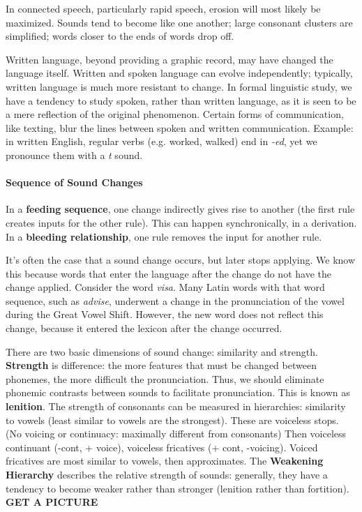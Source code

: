 \documentclass{exam}
\begin{document}
In connected speech, particularly rapid speech, erosion will most likely be maximized. Sounds tend to become like one another; large consonant clusters are simplified; words closer to the ends of words drop off. 

Written language, beyond providing a graphic record, may have changed the language itself. Written and spoken language can evolve independently; typically, written language is much more resistant to change. In formal linguistic study, we have a tendency to study spoken, rather than written language, as it is seen to be a mere reflection of the original phenomenon. Certain forms of communication, like texting, blur the lines between spoken and written communication. Example: in written English, regular verbs (e.g. worked, walked) end in \textit{-ed}, yet we pronounce them with a \textit{t} sound. 

\paragraph{Sequence of Sound Changes} In a \textbf{feeding sequence}, one change indirectly gives rise to another (the first rule creates inputs for the other rule). This can happen synchronically, in a derivation. In a \textbf{bleeding relationship}, one rule removes the input for another rule.

It's often the case that a sound change occurs, but later stops applying. We know this because words that enter the language after the change do not have the change applied. Consider the word \textit{visa}. Many Latin words with that word sequence, such as \textit{advise}, underwent a change in the pronunciation of the vowel during the Great Vowel Shift. However, the new word does not reflect this change, because it entered the lexicon after the change occurred. 

There are two basic dimensions of sound change: similarity and strength. \textbf{Strength} is difference: the more features that must be changed between phonemes, the more difficult the pronunciation. Thus, we should eliminate phonemic contrasts between sounds to facilitate pronunciation. This is known as \textbf{lenition}. The strength of consonants can be measured in hierarchies: similarity to vowels (least similar to vowels are the strongest). These are voiceless stops. (No voicing or continuacy: maximally different from consonants) Then voiceless continuant (-cont, + voice), voiceless fricatives (+ cont, -voicing). Voiced fricatives are most similar to vowels, then approximates. The \textbf{Weakening Hierarchy} describes the relative strength of sounds: generally, they have a tendency to become weaker rather than stronger (lenition rather than fortition). 
\textbf{GET A PICTURE}
\end{document}
